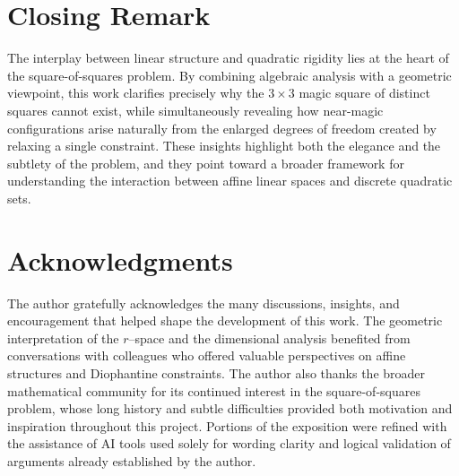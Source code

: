 \documentclass[12pt]{article}
\begin{document}
\section*{Closing Remark}

The interplay between linear structure and quadratic rigidity lies at the heart
of the square-of-squares problem.  By combining algebraic analysis with a
geometric viewpoint, this work clarifies precisely why the $3\times 3$ magic
square of distinct squares cannot exist, while simultaneously revealing how
near-magic configurations arise naturally from the enlarged degrees of freedom
created by relaxing a single constraint.  These insights highlight both the
elegance and the subtlety of the problem, and they point toward a broader
framework for understanding the interaction between affine linear spaces and
discrete quadratic sets.

\section*{Acknowledgments}

The author gratefully acknowledges the many discussions, insights, and
encouragement that helped shape the development of this work.  The geometric
interpretation of the $r$--space and the dimensional analysis benefited from
conversations with colleagues who offered valuable perspectives on affine
structures and Diophantine constraints.  The author also thanks the broader
mathematical community for its continued interest in the square-of-squares
problem, whose long history and subtle difficulties provided both motivation
and inspiration throughout this project.  Portions of the exposition were
refined with the assistance of AI tools used solely for wording clarity and
logical validation of arguments already established by the author.
\end{document}
